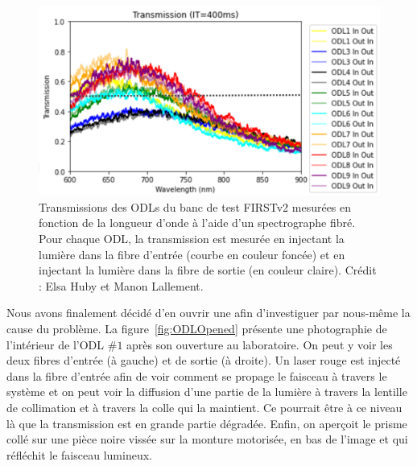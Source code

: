 \begin{figure}[ht!]
    \centering
    \includegraphics[width=\figwidth]{Figure_Chap2/ODL_Throughput_VS_Wavelength.png}
    \caption[Transmissions des ODLs du banc de test FIRSTv2 mesurées en fonction de la longueur d'onde.]{Transmissions des ODLs du banc de test FIRSTv2 mesurées en fonction de la longueur d'onde à l'aide d'un spectrographe fibré. Pour chaque ODL, la transmission est mesurée en injectant la lumière dans la fibre d'entrée (courbe en couleur foncée) et en injectant la lumière dans la fibre de sortie (en couleur claire). Crédit : Elsa Huby et Manon Lallement.}
    \label{fig:ODLThroughput}
\end{figure}

Nous avons finalement décidé d'en ouvrir une afin d'investiguer par nous-même la cause du problème. La figure~\ref{fig:ODLOpened} présente une photographie de l'intérieur de l'\ac{ODL} $\#1$ après son ouverture au laboratoire. On peut y voir les deux fibres d'entrée (à gauche) et de sortie (à droite). Un laser rouge est injecté dans la fibre d'entrée afin de voir comment se propage le faisceau à travers le système et on peut voir la diffusion d'une partie de la lumière à travers la lentille de collimation et à travers la colle qui la maintient. Ce pourrait être à ce niveau là que la transmission est en grande partie dégradée. Enfin, on aperçoit le prisme collé sur une pièce noire vissée sur la monture motorisée, en bas de l'image et qui réfléchit le faisceau lumineux.

